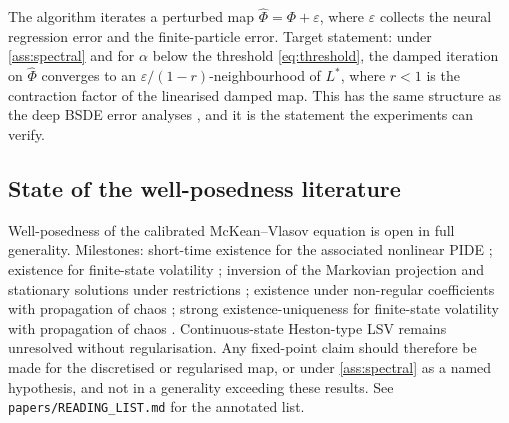 \documentclass[11pt,a4paper]{article}
\theoremstyle{plain}
\theoremstyle{definition}
\theoremstyle{definition}
\newcommand{\Lev}{L}
\newcommand{\Phimap}{\Phi}
\begin{document}
The algorithm iterates a perturbed map $\widehat{\Phimap} = \Phimap + \varepsilon$, where $\varepsilon$ collects the neural regression error and the finite-particle error. Target statement: under \cref{ass:spectral} and for $\alpha$ below the threshold \cref{eq:threshold}, the damped iteration on $\widehat{\Phimap}$ converges to an $\varepsilon/(1-r)$-neighbourhood of $\Lev^*$, where $r < 1$ is the contraction factor of the linearised damped map. This has the same structure as the deep BSDE error analyses \citep{hure2020}, and it is the statement the experiments can verify.

\subsection{State of the well-posedness literature}

Well-posedness of the calibrated McKean--Vlasov equation is open in full generality. Milestones: short-time existence for the associated nonlinear PIDE \citep{abergel2010}; existence for finite-state volatility \citep{jourdainzhou2020}; inversion of the Markovian projection and stationary solutions under restrictions \citep{lacker2020}; existence under non-regular coefficients with propagation of chaos \citep{djete2022}; strong existence-uniqueness for finite-state volatility with propagation of chaos \citep{mustapha2024}. Continuous-state Heston-type LSV remains unresolved without regularisation. Any fixed-point claim should therefore be made for the discretised or regularised map, or under \cref{ass:spectral} as a named hypothesis, and not in a generality exceeding these results. See \texttt{papers/READING\_LIST.md} for the annotated list.
\end{document}

